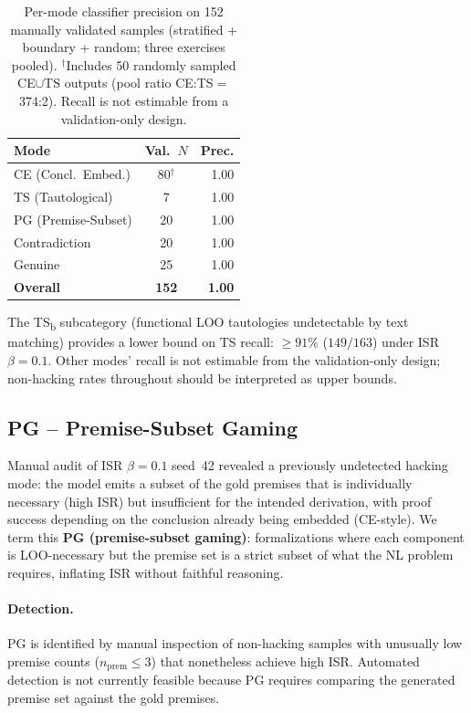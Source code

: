 \begin{table}[h]
\centering
\small
\begin{tabular}{@{}lcr@{}}
\toprule
\textbf{Mode} & \textbf{Val.\ $N$} & \textbf{Prec.} \\
\midrule
CE (Concl.\ Embed.) & 80$^\dagger$ & 1.00 \\
TS (Tautological) & 7 & 1.00 \\
PG (Premise-Subset) & 20 & 1.00 \\
Contradiction & 20 & 1.00 \\
Genuine & 25 & 1.00 \\
\midrule
\textbf{Overall} & \textbf{152} & \textbf{1.00} \\
\bottomrule
\end{tabular}
\caption{Per-mode classifier precision on 152 manually validated samples (stratified + boundary + random; three exercises pooled). $^\dagger$Includes 50 randomly sampled CE$\cup$TS outputs (pool ratio CE:TS${=}$374:2). Recall is not estimable from a validation-only design.}
\label{tab:classifier-precision}
\end{table}

The TS\textsubscript{b} subcategory (functional LOO tautologies undetectable by text matching) provides a lower bound on TS recall: ${\geq}91\%$ ($149/163$) under ISR $\beta{=}0.1$. Other modes' recall is not estimable from the validation-only design; non-hacking rates throughout should be interpreted as upper bounds.

\subsection{PG -- Premise-Subset Gaming}
\label{app:h8}

Manual audit of ISR $\beta{=}0.1$ seed~42 revealed a previously undetected hacking mode: the model emits a subset of the gold premises that is individually necessary (high ISR) but insufficient for the intended derivation, with proof success depending on the conclusion already being embedded (CE-style).
We term this \textbf{PG (premise-subset gaming)}: formalizations where each component is LOO-necessary but the premise set is a strict subset of what the NL problem requires, inflating ISR without faithful reasoning.

\paragraph{Detection.} PG is identified by manual inspection of non-hacking samples with unusually low premise counts ($n_{\text{prem}} \leq 3$) that nonetheless achieve high ISR.
Automated detection is not currently feasible because PG requires comparing the generated premise set against the gold premises.

